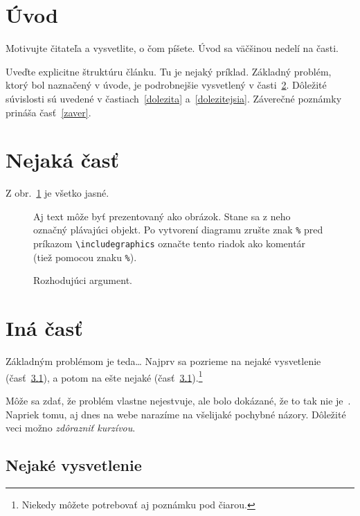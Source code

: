 \documentclass[10pt,twoside,slovak,a4paper]{coursepaper}
\begin{document}
\section{Úvod}

Motivujte čitateľa a vysvetlite, o čom píšete. Úvod sa väčšinou nedelí na časti.

Uveďte explicitne štruktúru článku. Tu je nejaký príklad.
Základný problém, ktorý bol naznačený v úvode, je podrobnejšie vysvetlený v časti~\ref{nejaka}.
Dôležité súvislosti sú uvedené v častiach~\ref{dolezita} a~\ref{dolezitejsia}.
Záverečné poznámky prináša časť~\ref{zaver}.



\section{Nejaká časť} \label{nejaka}

Z obr.~\ref{f:rozhod} je všetko jasné. 

\begin{figure}[tbh]
\centering
Aj text môže byť prezentovaný ako obrázok. Stane sa z neho označný plávajúci objekt. Po vytvorení diagramu zrušte znak \texttt{\%} pred príkazom \verb|\includegraphics| označte tento riadok ako komentár (tiež pomocou znaku \texttt{\%}).
\caption{Rozhodujúci argument.}
\label{f:rozhod}
\end{figure}



\section{Iná časť} \label{ina}

Základným problémom je teda\ldots{} Najprv sa pozrieme na nejaké vysvetlenie (časť~\ref{ina:nejake}), a potom na ešte nejaké (časť~\ref{ina:nejake}).\footnote{Niekedy môžete potrebovať aj poznámku pod čiarou.}

Môže sa zdať, že problém vlastne nejestvuje\cite{Coplien:MPD}, ale bolo dokázané, že to tak nie je~\cite{Czarnecki:Staged, Czarnecki:Progress}. Napriek tomu, aj dnes na webe narazíme na všelijaké pochybné názory\cite{PLP-Framework}. Dôležité veci možno \emph{zdôrazniť kurzívou}.


\subsection{Nejaké vysvetlenie} \label{ina:nejake}
\end{document}
